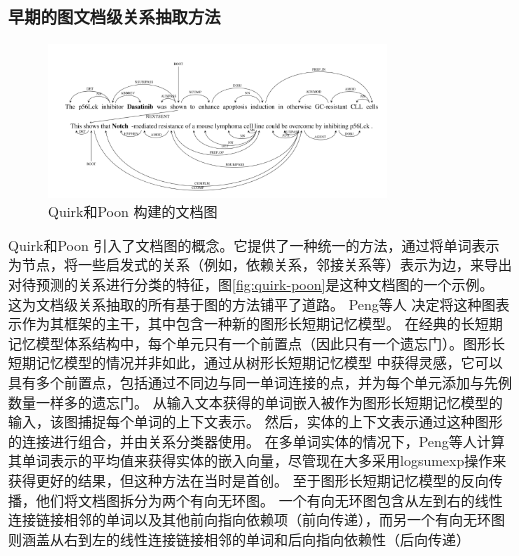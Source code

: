\documentclass[bachelor]{thesis-uestc}
\begin{document}
\subsubsection{早期的图文档级关系抽取方法}\label{subsec:early-graph}
\begin{figure}[htbp]
    \centering
    \includegraphics[width=0.8\textwidth]{misc/doc_graph_2017.png}
    \caption{Quirk和Poon \cite{quirk-poon-2017-distant}构建的文档图}
\end{figure}\label{fig:quirk-poon}
Quirk和Poon \cite{quirk-poon-2017-distant} 引入了文档图的概念。它提供了一种统一的方法，通过将单词表示为节点，将一些启发式的关系（例如，依赖关系，邻接关系等）表示为边，来导出对待预测的关系进行分类的特征，图\ref{fig:quirk-poon}是这种文档图的一个示例。
这为文档级关系抽取的所有基于图的方法铺平了道路。
Peng等人 \cite{peng-etal-2017-cross} 决定将这种图表示作为其框架的主干，其中包含一种新的图形长短期记忆模型。
在经典的长短期记忆模型体系结构中，每个单元只有一个前置点（因此只有一个遗忘门）。图形长短期记忆模型的情况并非如此，通过从树形长短期记忆模型 \cite{tai-etal-2015-improved} 中获得灵感，它可以具有多个前置点，包括通过不同边与同一单词连接的点，并为每个单元添加与先例数量一样多的遗忘门。
从输入文本获得的单词嵌入被作为图形长短期记忆模型的输入，该图捕捉每个单词的上下文表示。
然后，实体的上下文表示通过这种图形的连接进行组合，并由关系分类器使用。
在多单词实体的情况下，Peng等人计算其单词表示的平均值来获得实体的嵌入向量，尽管现在大多采用logsumexp操作来获得更好的结果，但这种方法在当时是首创。
至于图形长短期记忆模型的反向传播，他们将文档图拆分为两个有向无环图。
一个有向无环图包含从左到右的线性连接链接相邻的单词以及其他前向指向依赖项（前向传递），而另一个有向无环图则涵盖从右到左的线性连接链接相邻的单词和后向指向依赖性（后向传递） \par
\end{document}

